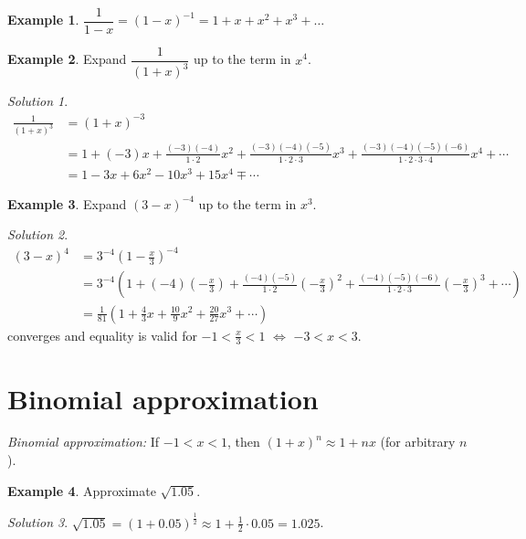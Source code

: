 \documentclass[
  12pt,
  oneside]{book}
\theoremstyle{definition}
\theoremstyle{definition}
\newtheorem{example}{Example}[chapter]
\theoremstyle{definition}
\theoremstyle{definition}
\theoremstyle{remark}
\newtheorem*{solution}{Solution}
\begin{document}
\begin{example}
\(\dfrac{1}{1-x} = (1-x)^{-1} = 1+x+x^2+x^3+\dots\)
\end{example}

\begin{example}
Expand \(\dfrac{1}{(1+x)^3}\) up to the term in \(x^4\).
\end{example}

\begin{solution}
\begin{align*}
\frac{1}{(1+x)^3} &= (1+x)^{-3}\\
&= 1+(-3)x+\frac{(-3)(-4)}{1\cdot 2}x^2 + \frac{(-3)(-4)(-5)}{1\cdot 2\cdot 3}x^3 + \frac{(-3)(-4)(-5)(-6)}{1\cdot 2\cdot 3\cdot 4}x^4 + \cdots\\
&=1-3x+6x^2-10x^3+15x^4 \mp \cdots
\end{align*}
\end{solution}

\begin{example}
Expand \((3-x)^{-4}\) up to the term in \(x^3\).
\end{example}

\begin{solution}
\begin{align*}
(3-x)^4 &= 3^{-4}(1-\frac{x}{3})^{-4}\\
&= 3^{-4}\left(1+(-4)\left(-\frac{x}{3}\right)
+\frac{(-4)(-5)}{1\cdot 2}\left(-\frac{x}{3}\right)^2 + \frac{(-4)(-5)(-6)}{1\cdot 2\cdot 3}\left(-\frac{x}{3}\right)^3+\cdots\right)\\
&= \frac{1}{81}\left(1+\frac{4}{3}x+\frac{10}{9}x^2+\frac{20}{27}x^3+\cdots\right)
\end{align*}
converges and equality is valid for \(-1<\frac{x}{3}<1\) \(\iff\) \(-3<x<3\).
\end{solution}

\hypertarget{binomial-approximation}{%
\section{Binomial approximation}\label{binomial-approximation}}

\emph{Binomial approximation:} If \(-1<x<1\), then \((1+x)^n \approx 1+nx\) (for arbitrary \(n\)).

\begin{example}
Approximate \(\sqrt{1.05}\).
\end{example}

\begin{solution}
\(\sqrt{1.05} = (1+0.05)^{\frac12} \approx 1+\frac12\cdot0.05 = 1.025\).
\end{solution}
\end{document}
